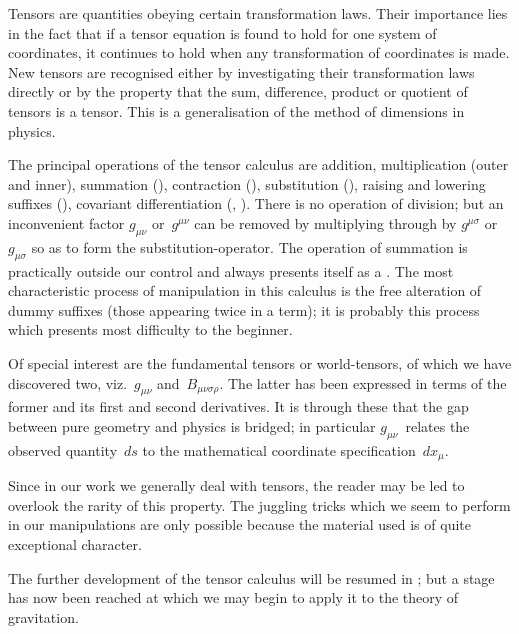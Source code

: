 \documentclass[12pt]{book}
\begin{document}

Tensors are quantities obeying certain transformation laws. Their importance
lies in the fact that if a tensor equation is found to hold for one
system of coordinates, it continues to hold when any transformation of
coordinates is made. New tensors are recognised either by investigating
their transformation laws directly or by the property that the sum, difference,
product or quotient of tensors is a tensor. This is a generalisation of the
method of dimensions in physics.

The principal operations of the tensor calculus are addition, multiplication
(outer and inner), summation (), contraction (), substitution (),
raising and lowering suffixes (), covariant differentiation (, ). There
is no operation of division; but an inconvenient factor $g_{\mu\nu}$ or~$g^{\mu\nu}$ can be
removed by multiplying through by $g^{\mu\sigma}$ or~$g_{\mu\sigma}$ so as to form the substitution\hyp{}operator.
The operation of summation is practically outside our control and
always presents itself as a . The most characteristic process of
manipulation in this calculus is the free alteration of dummy suffixes (those
appearing twice in a term); it is probably this process which presents most
difficulty to the beginner.

Of special interest are the fundamental tensors or world\hyp{}tensors, of which we
have discovered two, viz.\ $g_{\mu\nu}$ and~$B_{\mu\nu\sigma\rho}$. The latter has been expressed in terms
of the former and its first and second derivatives. It is through these that the
gap between pure geometry and physics is bridged; in particular $g_{\mu\nu}$~relates
the observed quantity~$ds$ to the mathematical coordinate specification~$dx_{\mu}$.

Since in our work we generally deal with tensors, the reader may be led
to overlook the rarity of this property. The juggling tricks which we seem
to perform in our manipulations are only possible because the material used
is of quite exceptional character.

The further development of the tensor calculus will be resumed in ;
but a stage has now been reached at which we may begin to apply it to the
theory of gravitation.


%
\end{document}
